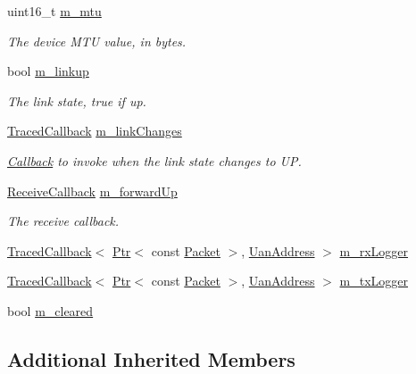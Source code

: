 \begin{DoxyCompactItemize}
uint16\+\_\+t \hyperlink{classns3_1_1UanNetDevice_ae7c34c0bb24052fba7fbdcfb50f94214}{m\+\_\+mtu}
\begin{DoxyCompactList}\small\item\em The device M\+TU value, in bytes. \end{DoxyCompactList}\item 
bool \hyperlink{classns3_1_1UanNetDevice_a983f3b724d8d8926b09e9228d0b5a7b2}{m\+\_\+linkup}
\begin{DoxyCompactList}\small\item\em The link state, true if up. \end{DoxyCompactList}\item 
\hyperlink{classns3_1_1TracedCallback}{Traced\+Callback} \hyperlink{classns3_1_1UanNetDevice_ab061747ef6929cb5ba1288d68ab5a679}{m\+\_\+link\+Changes}
\begin{DoxyCompactList}\small\item\em \hyperlink{classns3_1_1Callback}{Callback} to invoke when the link state changes to UP. \end{DoxyCompactList}\item 
\hyperlink{classns3_1_1NetDevice_ad5e5e1ca187472bc2ba99575d8def568}{Receive\+Callback} \hyperlink{classns3_1_1UanNetDevice_aee4321afad0167cdb8f3a6956be03983}{m\+\_\+forward\+Up}
\begin{DoxyCompactList}\small\item\em The receive callback. \end{DoxyCompactList}\item 
\hyperlink{classns3_1_1TracedCallback}{Traced\+Callback}$<$ \hyperlink{classns3_1_1Ptr}{Ptr}$<$ const \hyperlink{classns3_1_1Packet}{Packet} $>$, \hyperlink{classns3_1_1UanAddress}{Uan\+Address} $>$ \hyperlink{classns3_1_1UanNetDevice_a427c15bb70e38facb1c50fe76bfe1979}{m\+\_\+rx\+Logger}
\item 
\hyperlink{classns3_1_1TracedCallback}{Traced\+Callback}$<$ \hyperlink{classns3_1_1Ptr}{Ptr}$<$ const \hyperlink{classns3_1_1Packet}{Packet} $>$, \hyperlink{classns3_1_1UanAddress}{Uan\+Address} $>$ \hyperlink{classns3_1_1UanNetDevice_ab1ed35043886ee497c4ea96267c50b79}{m\+\_\+tx\+Logger}
\item 
bool \hyperlink{classns3_1_1UanNetDevice_a94db1f444365c0961e0dc9b2faee00cf}{m\+\_\+cleared}
\end{DoxyCompactItemize}
\subsection*{Additional Inherited Members}



